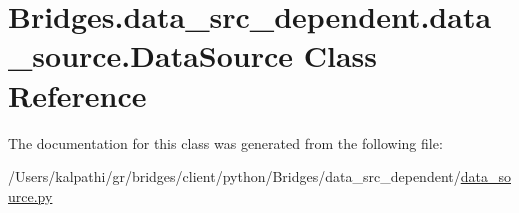 \hypertarget{class_bridges_1_1data__src__dependent_1_1data__source_1_1_data_source}{}\section{Bridges.\+data\+\_\+src\+\_\+dependent.\+data\+\_\+source.\+Data\+Source Class Reference}
\label{class_bridges_1_1data__src__dependent_1_1data__source_1_1_data_source}


The documentation for this class was generated from the following file\+:\begin{DoxyCompactItemize}
\item 
/\+Users/kalpathi/gr/bridges/client/python/\+Bridges/data\+\_\+src\+\_\+dependent/\hyperlink{data__source_8py}{data\+\_\+source.\+py}\end{DoxyCompactItemize}
